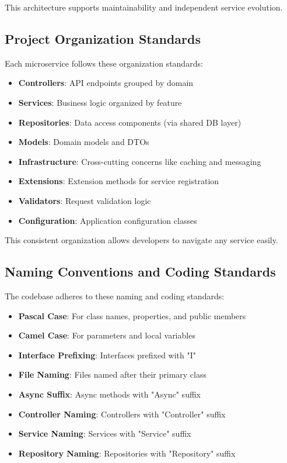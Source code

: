 This architecture supports maintainability and independent service evolution.

\subsection{Project Organization Standards}
Each microservice follows these organization standards:
\begin{itemize}
    \item \textbf{Controllers}: API endpoints grouped by domain
    \item \textbf{Services}: Business logic organized by feature
    \item \textbf{Repositories}: Data access components (via shared DB layer)
    \item \textbf{Models}: Domain models and DTOs
    \item \textbf{Infrastructure}: Cross-cutting concerns like caching and messaging
    \item \textbf{Extensions}: Extension methods for service registration
    \item \textbf{Validators}: Request validation logic
    \item \textbf{Configuration}: Application configuration classes
\end{itemize}

This consistent organization allows developers to navigate any service easily.

\subsection{Naming Conventions and Coding Standards}
The codebase adheres to these naming and coding standards:
\begin{itemize}
    \item \textbf{Pascal Case}: For class names, properties, and public members
    \item \textbf{Camel Case}: For parameters and local variables
    \item \textbf{Interface Prefixing}: Interfaces prefixed with "I"
    \item \textbf{File Naming}: Files named after their primary class
    \item \textbf{Async Suffix}: Async methods with "Async" suffix
    \item \textbf{Controller Naming}: Controllers with "Controller" suffix
    \item \textbf{Service Naming}: Services with "Service" suffix
    \item \textbf{Repository Naming}: Repositories with "Repository" suffix
\end{itemize}

